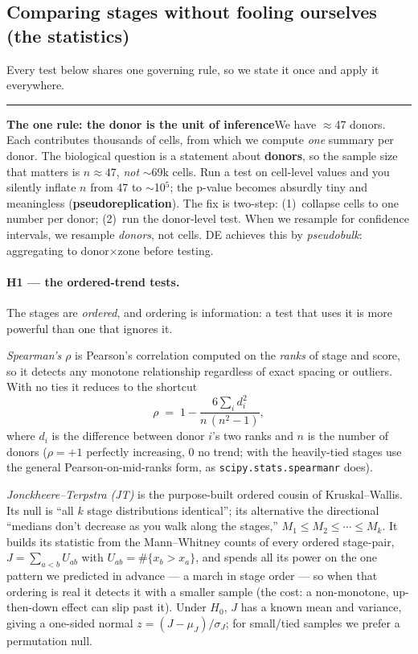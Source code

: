 \documentclass[11pt]{article}
\newcommand{\aside}[2]{\par\medskip\noindent\textcolor{teal0}{\rule{2pt}{\baselineskip}}\quad\textbf{\textcolor{teal0}{#1}}\quad #2\par\medskip}
\newcommand{\code}[1]{\texttt{#1}}
\begin{document}
\subsection{Comparing stages without fooling ourselves (the statistics)}
\label{sec:stats}

Every test below shares one governing rule, so we state it once and apply it everywhere.

\aside{The one rule: the donor is the unit of inference}{We have $\approx$47 donors. Each contributes
thousands of cells, from which we compute \emph{one} summary per donor. The biological question is a
statement about \textbf{donors}, so the sample size that matters is $n\approx 47$, \emph{not} $\sim$69k
cells. Run a test on cell-level values and you silently inflate $n$ from 47 to $\sim$10$^5$; the p-value
becomes absurdly tiny and meaningless (\textbf{pseudoreplication}). The fix is two-step: (1)~collapse
cells to one number per donor; (2)~run the donor-level test. When we resample for confidence intervals,
we resample \emph{donors}, not cells. DE achieves this by \emph{pseudobulk}: aggregating to
donor$\times$zone before testing.}

\paragraph{H1 --- the ordered-trend tests.} The stages are \emph{ordered}, and ordering is information:
a test that uses it is more powerful than one that ignores it.

\emph{Spearman's $\rho$} is Pearson's correlation computed on the \emph{ranks} of stage and score, so
it detects any monotone relationship regardless of exact spacing or outliers. With no ties it reduces
to the shortcut
\begin{equation}
\rho \;=\; 1 - \frac{6\sum_i d_i^2}{n\,(n^2-1)},
\end{equation}
where $d_i$ is the difference between donor $i$'s two ranks and $n$ is the number of donors ($\rho=+1$
perfectly increasing, $0$ no trend; with the heavily-tied stages use the general Pearson-on-mid-ranks
form, as \code{scipy.stats.spearmanr} does).

\emph{Jonckheere--Terpstra (JT)} is the purpose-built ordered cousin of Kruskal--Wallis. Its null is
``all $k$ stage distributions identical''; its alternative the directional ``medians don't decrease as
you walk along the stages,'' $M_1\le M_2\le\cdots\le M_k$. It builds its statistic from the
Mann--Whitney counts of every ordered stage-pair, $J=\sum_{a<b}U_{ab}$ with
$U_{ab}=\#\{x_b>x_a\}$, and spends all its power on the one pattern we predicted in advance --- a march
in stage order --- so when that ordering is real it detects it with a smaller sample (the cost: a
non-monotone, up-then-down effect can slip past it). Under $H_0$, $J$ has a known mean and variance,
giving a one-sided normal $z=(J-\mu_J)/\sigma_J$; for small/tied samples we prefer a permutation null.
\end{document}
